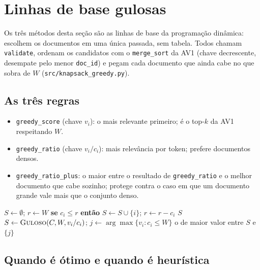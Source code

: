 \section{Linhas de base gulosas}

Os três métodos desta seção são as linhas de base da programação dinâmica:
escolhem os documentos em uma única passada, sem tabela. Todos chamam
\texttt{validate}, ordenam os candidatos com o \texttt{merge\_sort} da AV1
(chave decrescente, desempate pelo menor \texttt{doc\_id}) e pegam cada
documento que ainda cabe no que sobra de $W$ (\texttt{src/knapsack\_greedy.py}).

\subsection{As três regras}

\begin{itemize}
  \item \texttt{greedy\_score} (chave $v_i$): o mais relevante primeiro; é o
    top-$k$ da AV1 respeitando $W$.
  \item \texttt{greedy\_ratio} (chave $v_i/c_i$): mais relevância por token;
    prefere documentos densos.
  \item \texttt{greedy\_ratio\_plus}: o maior entre o resultado de
    \texttt{greedy\_ratio} e o melhor documento que cabe sozinho; protege
    contra o caso em que um documento grande vale mais que o conjunto denso.
\end{itemize}

\begin{algorithm}[ht]
\caption{Gulosos: \texttt{greedy\_score} = \textsc{Guloso}$(C, W, v_i)$ e
\texttt{greedy\_ratio} = \textsc{Guloso}$(C, W, v_i/c_i)$.}
\begin{algorithmic}[1]
  \State $S \gets \emptyset$;\; $r \gets W$
    \State \textbf{se} $c_i \le r$ \textbf{então} $S \gets S \cup \{i\}$;\; $r \gets r - c_i$
  \EndFor
  \State \Return $S$
\EndFunction
{}
  \State $S \gets \textsc{Guloso}(C, W, v_i/c_i)$;\;
    $j \gets \arg\max\{v_i : c_i \le W\}$
  \State \Return o de maior valor entre $S$ e $\{j\}$ 
\EndFunction
\end{algorithmic}
\end{algorithm}

\subsection{Quando é ótimo e quando é heurística}

